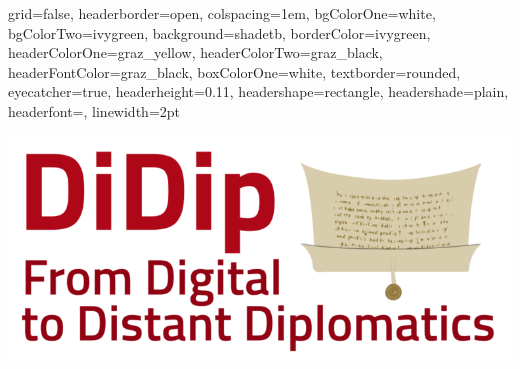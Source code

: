 \documentclass[a0paper,portrait]{baposter}
\begin{document}
\begin{poster} %
{
grid=false, %
headerborder=open, %
colspacing=1em, %
bgColorOne=white, %
bgColorTwo=ivygreen, %
background=shadetb, %
borderColor=ivygreen, %
headerColorOne=graz_yellow, %
headerColorTwo=graz_black, %
headerFontColor=graz_black, %
boxColorOne=white, %
textborder=rounded, %
eyecatcher=true, %
headerheight=0.11\textheight, %
headershape=rectangle, %
headershade=plain,
headerfont=\Large\textsf, %
linewidth=2pt %
}
{\begin{minipage}{.125\linewidth}
	\includegraphics[width=\linewidth]{didip_sm.png}


\end{minipage}}
\end{poster}
\end{document}
